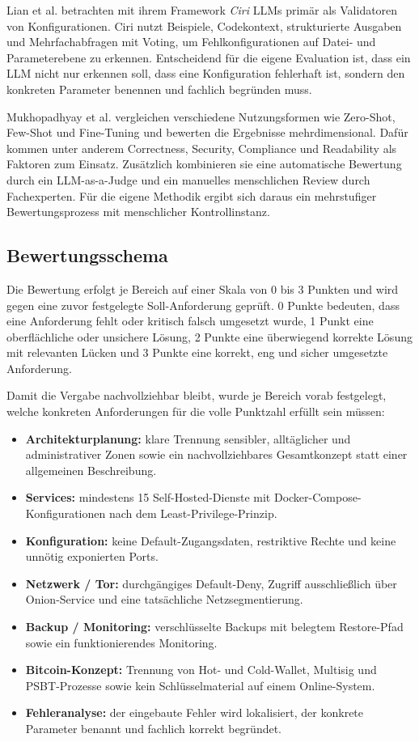 Lian et al. betrachten mit ihrem Framework \emph{Ciri} \acs{LLM}s primär als Validatoren von Konfigurationen. 
Ciri nutzt Beispiele, Codekontext, strukturierte Ausgaben und Mehrfachabfragen mit Voting, um Fehlkonfigurationen auf Datei- und Parameterebene zu erkennen. 
Entscheidend für die eigene Evaluation ist, dass ein \acs{LLM} nicht nur erkennen soll, dass eine Konfiguration fehlerhaft ist, sondern den konkreten Parameter benennen und fachlich begründen muss.\cite{KIConfigValidators}

Mukhopadhyay et al. vergleichen verschiedene Nutzungsformen wie Zero-Shot, Few-Shot und Fine-Tuning und bewerten die Ergebnisse mehrdimensional. Dafür kommen unter anderem Correctness, Security, Compliance und Readability als Faktoren zum Einsatz. Zusätzlich kombinieren sie eine automatische Bewertung durch ein \acs{LLM}-as-a-Judge und ein manuelles menschlichen Review durch Fachexperten. Für die eigene Methodik ergibt sich daraus ein mehrstufiger Bewertungsprozess mit menschlicher Kontrollinstanz.\cite{KIIaC}

\subsection{Bewertungsschema}

Die Bewertung erfolgt je Bereich auf einer Skala von 0 bis 3 Punkten und wird gegen eine zuvor festgelegte Soll-Anforderung geprüft. 
0 Punkte bedeuten, dass eine Anforderung fehlt oder kritisch falsch umgesetzt wurde, 
1 Punkt eine oberflächliche oder unsichere Lösung, 
2 Punkte eine überwiegend korrekte Lösung mit relevanten Lücken und 
3 Punkte eine korrekt, eng und sicher umgesetzte Anforderung. 

Damit die Vergabe nachvollziehbar bleibt, wurde je Bereich vorab festgelegt, welche konkreten Anforderungen für die volle Punktzahl erfüllt sein müssen:
\begin{itemize}
\item \textbf{Architekturplanung:} klare Trennung sensibler, alltäglicher und administrativer Zonen sowie ein nachvollziehbares Gesamtkonzept statt einer allgemeinen Beschreibung.
\item \textbf{Services:} mindestens 15 Self-Hosted-Dienste mit Docker-Compose-Konfigurationen nach dem Least-Privilege-Prinzip.
\item \textbf{Konfiguration:} keine Default-Zugangsdaten, restriktive Rechte und keine unnötig exponierten Ports.
\item \textbf{Netzwerk / Tor:} durchgängiges Default-Deny, Zugriff ausschließlich über Onion-Service und eine tatsächliche Netzsegmentierung.
\item \textbf{Backup / Monitoring:} verschlüsselte Backups mit belegtem Restore-Pfad sowie ein funktionierendes Monitoring.
\item \textbf{Bitcoin-Konzept:} Trennung von Hot- und Cold-Wallet, Multisig und \acs{PSBT}-Prozesse sowie kein Schlüsselmaterial auf einem Online-System.
\item \textbf{Fehleranalyse:} der eingebaute Fehler wird lokalisiert, der konkrete Parameter benannt und fachlich korrekt begründet.
\end{itemize}

